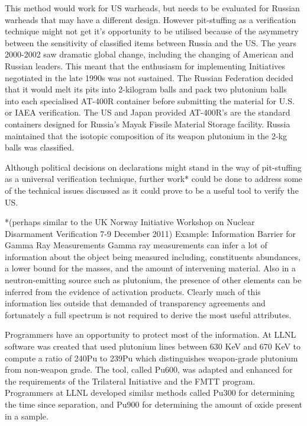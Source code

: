 \documentclass[twoside,titlepage,11pt,twocolumn,a4paper]{article}
\begin{document}
\citep{matthew1998} This method would work for US warheads, but needs
to be evaluated for Russian warheads that may have a different
design. \citep{zarimpas2003} However pit-stuffing as a verification technique
might not get it's opportunity to be utilised because of the asymmetry
between the sensitivity of classified items between Russia and the
US. The years 2000-2002 saw dramatic global change, including the
changing of American and Russian leaders. This meant that the
enthusiasm for implementing Initiatives negotiated in the late 1990s
was not sustained. The Russian Federation decided that it would melt
its pits into 2-kilogram balls and pack two plutonium balls into each
specialised AT-400R container before submitting the material for
U.S. or IAEA verification. The US and Japan provided AT-400R's are the
standard containers designed for Russia's Mayak Fissile Material
Storage facility. Russia maintained that the isotopic composition of
its weapon plutonium in the 2-kg balls was classified. \citep{IPFN2008}

Although political decisions on declarations might stand in the way of
pit-stuffing as a universal verification technique, further work*
could be done to address some of the technical issues discussed as it
could prove to be a useful tool to verify the US.

*(perhaps similar to the UK Norway Initiative Workshop on Nuclear
Disarmament Verification 7-9 December 2011) Example: Information
Barrier for Gamma Ray Measurements Gamma ray measurements can infer a
lot of information about the object being measured including,
constituents abundances, a lower bound for the masses, and the amount
of intervening material. Also in a neutron-emitting source such as
plutonium, the presence of other elements can be inferred from the
evidence of activation products. Clearly much of this information lies
outside that demanded of transparency agreements and fortunately a
full spectrum is not required to derive the most useful attributes.

Programmers have an opportunity to protect most of the information. At
LLNL software was created that used plutonium lines between 630 KeV
and 670 KeV to compute a ratio of 240Pu to 239Pu which distinguishes
weapon-grade plutonium from non-weapon grade. The tool, called Pu600,
was adapted and enhanced for the requirements of the Trilateral
Initiative and the FMTT program. Programmers at LLNL developed similar
methods called Pu300 for determining the time since separation, and
Pu900 for determining the amount of oxide present in a sample.
\end{document}
